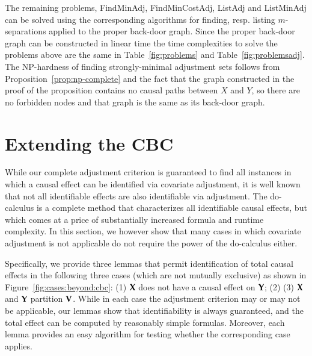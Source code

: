 The remaining problems, {\sc FindMinAdj}, {\sc FindMinCostAdj}, {\sc ListAdj} and {\sc ListMinAdj} 
can be solved using the corresponding algorithms
for finding, resp. listing  $m$-separations applied to the proper 
back-door graph.  Since the proper back-door graph can be
constructed in linear time the time complexities to solve the 
problems above are the same in Table~\ref{fig:problems} and Table~\ref{fig:problemsadj}. The NP-hardness of finding 
strongly-minimal adjustment sets follows from Proposition~\ref{prop:np-complete} and the fact that the graph 
constructed in the proof of the proposition contains no causal paths between $ X $ and $ Y $, 
so there are no forbidden nodes and that graph is the same as its back-door graph.

\section{Extending the CBC}

\label{sec:cbcext}

While our complete adjustment criterion is guaranteed to find all instances in which a causal effect can be identified via covariate adjustment, it is well known that not all identifiable effects are also identifiable via adjustment. The do-calculus \cite{Pearl2009} is a complete method that characterizes all identifiable causal effects, but which comes at a price of substantially increased formula and runtime complexity. In this section, we however show that many cases in which covariate adjustment is not applicable do not require the power of the do-calculus either. 
 
Specifically, we provide three lemmas that permit identification of total causal effects in the following three cases (which are not mutually exclusive) as shown in Figure~\ref{fig:cases:beyond:cbc}: (1) ${\bf X}$ does not have a causal effect on ${\bf Y}$; (2)  (3) ${\bf X}$ and ${\bf Y}$ partition ${\bf V}$. While in each case the adjustment criterion may or may not be applicable, our lemmas show that identifiability is always guaranteed, and the total effect can be computed by reasonably simple formulas. Moreover, each lemma provides an easy algorithm for testing whether the corresponding case applies.

